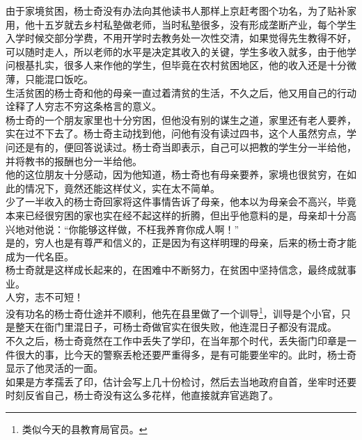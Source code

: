 \begin{multicols}{\theparacolNo}
由于家境贫困，杨士奇没有办法向其他读书人那样上京赶考图个功名，为了贴补家用，他十五岁就去乡村私塾做老师，当时私塾很多，没有形成垄断产业，每个学生入学时候交部分学费，不用开学时去教务处一次性交清，如果觉得先生教得不好，可以随时走人，所以老师的水平是决定其收入的关键，学生多收入就多，由于他学问根基扎实，很多人来作他的学生，但毕竟在农村贫困地区，他的收入还是十分微薄，只能混口饭吃。\\

生活贫困的杨士奇和他的母亲一直过着清贫的生活，不久之后，他又用自己的行动诠释了人穷志不穷这条格言的意义。\\

杨士奇的一个朋友家里也十分穷困，但他没有别的谋生之道，家里还有老人要养，实在过不下去了。杨士奇主动找到他，问他有没有读过四书，这个人虽然穷点，学问还是有的，便回答说读过。杨士奇当即表示，自己可以把教的学生分一半给他，并将教书的报酬也分一半给他。\\

他的这位朋友十分感动，因为他知道，杨士奇也有母亲要养，家境也很贫穷，在如此的情况下，竟然还能这样仗义，实在太不简单。\\

少了一半收入的杨士奇回家将这件事情告诉了母亲，他本以为母亲会不高兴，毕竟本来已经很穷困的家也实在经不起这样的折腾，但出乎他意料的是，母亲却十分高兴地对他说：“你能够这样做，不枉我养育你成人啊！”\\

是的，穷人也是有尊严和信义的，正是因为有这样明理的母亲，后来的杨士奇才能成为一代名臣。\\

杨士奇就是这样成长起来的，在困难中不断努力，在贫困中坚持信念，最终成就事业。\\

人穷，志不可短！\\

没有功名的杨士奇仕途并不顺利，他先在县里做了一个训导\footnote{类似今天的县教育局官员。}，训导是个小官，只是整天在衙门里混日子，可杨士奇做官实在很失败，他连混日子都没有混成。\\

不久之后，杨士奇竟然在工作中丢失了学印，在当年那个时代，丢失衙门印章是一件很大的事，比今天的警察丢枪还要严重得多，是有可能要坐牢的。此时，杨士奇显示了他灵活的一面。\\

如果是方孝孺丢了印，估计会写上几十份检讨，然后去当地政府自首，坐牢时还要时刻反省自己，杨士奇没有这么多花样，他直接就弃官逃跑了。\\


\end{multicols}
